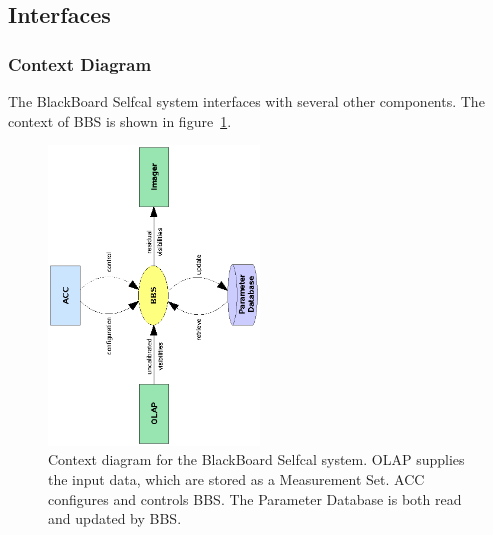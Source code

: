 \documentclass[10pt]{lofar}
\begin{document}
\subsection{Interfaces}
\label{subsec:sys-interfaces}

\subsubsection{Context Diagram}
\label{subsubsec:context}
The BlackBoard Selfcal system interfaces with several other components. The
context of BBS is shown in figure~\ref{fig:bbs-context-diagram}.

\begin{figure}[!ht]
\centering
\includegraphics[width=0.5\textwidth,angle=-90]{images/bbs-context-diagram}
\caption{Context diagram for the BlackBoard Selfcal system. OLAP supplies the
input data, which are stored as a Measurement Set. ACC configures and controls
BBS. The Parameter Database
is both read and updated by BBS.}
\label{fig:bbs-context-diagram}
\end{figure}
\end{document}
